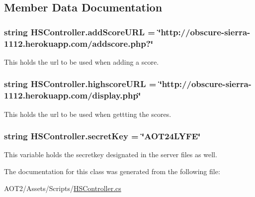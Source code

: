 \subsection{Member Data Documentation}
\hypertarget{class_h_s_controller_a0085dc21a81423ef8320f567f77cc8a5}{
\subsubsection[{add\-Score\-U\-R\-L}]{\setlength{\rightskip}{0pt plus 5cm}string H\-S\-Controller.\-add\-Score\-U\-R\-L = \char`\"{}http\-://obscure-\/sierra-\/1112.herokuapp.\-com/addscore.\-php?\char`\"{}}}\label{class_h_s_controller_a0085dc21a81423ef8320f567f77cc8a5}
This holds the url to be used when adding a score. \hypertarget{class_h_s_controller_a93e0dc2ed28bdd7d165934abc0a04545}{
\subsubsection[{highscore\-U\-R\-L}]{\setlength{\rightskip}{0pt plus 5cm}string H\-S\-Controller.\-highscore\-U\-R\-L = \char`\"{}http\-://obscure-\/sierra-\/1112.herokuapp.\-com/display.\-php\char`\"{}}}\label{class_h_s_controller_a93e0dc2ed28bdd7d165934abc0a04545}
This holds the url to be used when gettting the scores. \hypertarget{class_h_s_controller_ac0db055fde969bb2c85a406323d3aea2}{
\subsubsection[{secret\-Key}]{\setlength{\rightskip}{0pt plus 5cm}string H\-S\-Controller.\-secret\-Key = \char`\"{}A\-O\-T24\-L\-Y\-F\-E\char`\"{}\hspace{0.3cm}{\ttfamily [private]}}}\label{class_h_s_controller_ac0db055fde969bb2c85a406323d3aea2}
This variable holds the secretkey designated in the server files as well. 

The documentation for this class was generated from the following file\-:\begin{DoxyCompactItemize}
\item 
A\-O\-T2/\-Assets/\-Scripts/\hyperlink{_h_s_controller_8cs}{H\-S\-Controller.\-cs}\end{DoxyCompactItemize}
